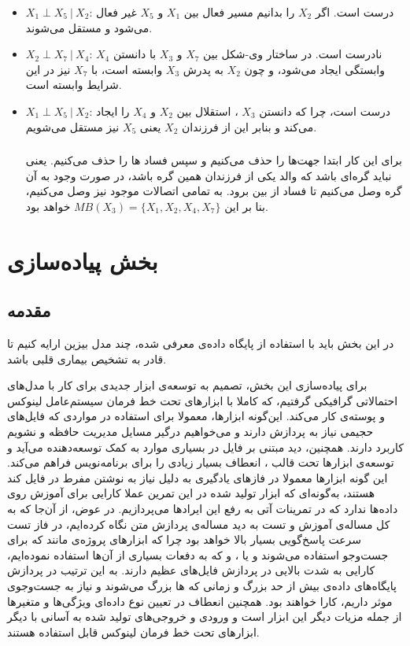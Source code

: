 \documentclass[11.5pt,a4paper]{article}
\begin{document}
\begin{itemize}
\item{$X_1 \perp X_5 \ | \ X_2 $}:
درست است. اگر 
$X_2$
را بدانیم مسیر فعال بین $X_1$ و $X_5$ غیر فعال می‌شود و مستقل می‌شوند.
\item{$X_2 \perp X_7 \ | \ X_4 $}:
نادرست است. در ساختار وی-شکل بین $X_7$ و $X_3$ با دانستن $X_4$ وابستگی ایجاد می‌شود، و چون $X_2$ به پدرش $X_3$ وابسته است، با $X_7$ نیز در این شرایط وابسته است. 

\item{$X_1 \perp X_5 \ | \ X_2 $}:
درست است، چرا که دانستن $X_3$ ، استقلال بین $X_2$ و $X_4$ را ایجاد می‌کند و بنابر این از فرزندان $X_2$ یعنی $X_5$ نیز مستقل می‌شویم. 

\subsubsection{  }
برای این کار ابتدا جهت‌ها را حذف می‌کنیم و سپس فساد ها را حذف می‌کنیم. یعنی نباید گره‌ای باشد که والد یکی از فرزندان همین گره باشد، در صورت وجود به آن گره وصل می‌کنیم تا فساد از بین برود. به تمامی اتصالات موجود نیز وصل می‌کنیم، بنا بر این
$MB(X_3) = \lbrace X_1 , X_2 , X_4 , X_7 \rbrace $
خواهد بود. 
\end{itemize}

\section{بخش پیاده‌سازی}

\subsection{مقدمه}
در این بخش باید با استفاده از پایگاه داده‌ی معرفی شده، چند مدل‌ بیزین ارایه کنیم تا قادر به تشخیص بیماری قلبی باشد. 

برای پیاده‌سازی این بخش، تصمیم به توسعه‌ی ابزار جدیدی برای کار با مدل‌های احتمالاتی گرافیکی گرفتیم، که کاملا با ابزارهای تحت خط فرمان سیستم‌عامل لینوکس و پوسته‌ی  کار می‌کند. این‌گونه ابزارها، معمولا برای استفاده در مواردی که فایل‌های حجیمی نیاز به پردازش دارند و می‌خواهیم درگیر مسایل مدیریت حافظه و  نشویم کاربرد دارند. همچنین، دید مبتنی بر فایل در بسیاری موارد به کمک توسعه‌دهنده می‌آید و توسعه‌ی ابزارها تحت قالب ، انعطاف بسیار زیادی را برای برنامه‌نویس فراهم می‌کند. این گونه ابزارها معمولا در فازهای یادگیری به دلیل نیاز به نوشتن مفرط در فایل کند هستند، به‌گونه‌ای که ابزار تولید شده در این تمرین عملا کارایی برای آموزش روی داده‌ها ندارد که در تمرینات آتی به رفع این ایرادها می‌پردازیم. در عوض، از آن‌جا که به کل مساله‌ی آموزش و تست به دید مساله‌ی پردازش متن نگاه کرده‌ایم، در فاز تست سرعت پاسخ‌گویی بسیار بالا خواهد بود چرا که ابزارهای پروژه‌ی  مانند  که برای جست‌وجو استفاده می‌شوند و یا ،  و  که به دفعات بسیاری از آن‌ها استفاده نموده‌ایم، کارایی به شدت بالایی در پردازش فایل‌های عظیم دارند. به این ترتیب در پردازش پایگاه‌های داده‌ی بیش از حد بزرگ و زمانی که  ها بزرگ می‌شوند و نیاز به جست‌وجوی موثر داریم، کارا خواهند بود. همچنین انعطاف در تعیین نوع داده‌ای ویژگی‌ها و متغیرها از جمله‌ مزیات دیگر این ابزار است و ورودی و خروجی‌های تولید شده به آسانی با دیگر ابزارهای تحت خط فرمان لینوکس قابل استفاده هستند. 
\end{document}
